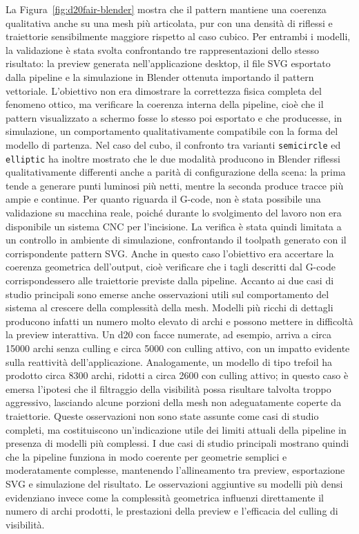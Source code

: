\documentclass[a4paper,11pt,titlepage,twoside]{book}
\newcommand{\1}{\mathbf{1}}
\numberwithin{equation}{chapter}
\theoremstyle{plain}
\theoremstyle{definition}
\begin{document}
	La Figura~\ref{fig:d20fair-blender} mostra che il pattern mantiene una coerenza qualitativa anche su una mesh più articolata, pur con una densità di riflessi e traiettorie sensibilmente maggiore rispetto al caso cubico.
	Per entrambi i modelli, la validazione è stata svolta confrontando tre rappresentazioni dello stesso risultato: la preview generata nell’applicazione desktop, il file SVG esportato dalla pipeline e la simulazione in Blender ottenuta importando il pattern vettoriale. L’obiettivo non era dimostrare la correttezza fisica completa del fenomeno ottico, ma verificare la coerenza interna della pipeline, cioè che il pattern visualizzato a schermo fosse lo stesso poi esportato e che producesse, in simulazione, un comportamento qualitativamente compatibile con la forma del modello di partenza.
	Nel caso del cubo, il confronto tra varianti \texttt{semicircle} ed \texttt{elliptic} ha inoltre mostrato che le due modalità producono in Blender riflessi qualitativamente differenti anche a parità di configurazione della scena: la prima tende a generare punti luminosi più netti, mentre la seconda produce tracce più ampie e continue.
	Per quanto riguarda il G-code, non è stata possibile una validazione su macchina reale, poiché durante lo svolgimento del lavoro non era disponibile un sistema CNC per l’incisione. La verifica è stata quindi limitata a un controllo in ambiente di simulazione, confrontando il toolpath generato con il corrispondente pattern SVG. Anche in questo caso l’obiettivo era accertare la coerenza geometrica dell’output, cioè verificare che i tagli descritti dal G-code corrispondessero alle traiettorie previste dalla pipeline.
	Accanto ai due casi di studio principali sono emerse anche osservazioni utili sul comportamento del sistema al crescere della complessità della mesh. Modelli più ricchi di dettagli producono infatti un numero molto elevato di archi e possono mettere in difficoltà la preview interattiva. Un d20 con facce numerate, ad esempio, arriva a circa 15000 archi senza culling e circa 5000 con culling attivo, con un impatto evidente sulla reattività dell’applicazione. Analogamente, un modello di tipo trefoil ha prodotto circa 8300 archi, ridotti a circa 2600 con culling attivo; in questo caso è emersa l’ipotesi che il filtraggio della visibilità possa risultare talvolta troppo aggressivo, lasciando alcune porzioni della mesh non adeguatamente coperte da traiettorie. Queste osservazioni non sono state assunte come casi di studio completi, ma costituiscono un’indicazione utile dei limiti attuali della pipeline in presenza di modelli più complessi.
	I due casi di studio principali mostrano quindi che la pipeline funziona in modo coerente per geometrie semplici e moderatamente complesse, mantenendo l’allineamento tra preview, esportazione SVG e simulazione del risultato. Le osservazioni aggiuntive su modelli più densi evidenziano invece come la complessità geometrica influenzi direttamente il numero di archi prodotti, le prestazioni della preview e l’efficacia del culling di visibilità.
	
\end{document}
